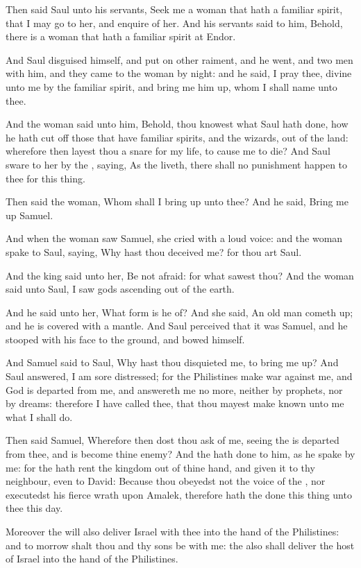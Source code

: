 \verse Then said Saul unto his servants, Seek me a woman that hath a familiar spirit, that I may go to her, and enquire of her. And his servants said to him, Behold, there is a woman that hath a familiar spirit at Endor.

\verse And Saul disguised himself, and put on other raiment, and he went, and two men with him, and they came to the woman by night: and he said, I pray thee, divine unto me by the familiar spirit, and bring me him up, whom I shall name unto thee.

\verse And the woman said unto him, Behold, thou knowest what Saul hath done, how he hath cut off those that have familiar spirits, and the wizards, out of the land: wherefore then layest thou a snare for my life, to cause me to die?  \verse And Saul sware to her by the \LORD, saying, As the \LORD liveth, there shall no punishment happen to thee for this thing.

\verse Then said the woman, Whom shall I bring up unto thee? And he said, Bring me up Samuel.

\verse And when the woman saw Samuel, she cried with a loud voice: and the woman spake to Saul, saying, Why hast thou deceived me? for thou art Saul.

\verse And the king said unto her, Be not afraid: for what sawest thou?  And the woman said unto Saul, I saw gods ascending out of the earth.

\verse And he said unto her, What form is he of? And she said, An old man cometh up; and he is covered with a mantle. And Saul perceived that it was Samuel, and he stooped with his face to the ground, and bowed himself.

\verse And Samuel said to Saul, Why hast thou disquieted me, to bring me up? And Saul answered, I am sore distressed; for the Philistines make war against me, and God is departed from me, and answereth me no more, neither by prophets, nor by dreams: therefore I have called thee, that thou mayest make known unto me what I shall do.

\verse Then said Samuel, Wherefore then dost thou ask of me, seeing the \LORD is departed from thee, and is become thine enemy?  \verse And the \LORD hath done to him, as he spake by me: for the \LORD hath rent the kingdom out of thine hand, and given it to thy neighbour, even to David: \verse Because thou obeyedst not the voice of the \LORD, nor executedst his fierce wrath upon Amalek, therefore hath the \LORD done this thing unto thee this day.

\verse Moreover the \LORD will also deliver Israel with thee into the hand of the Philistines: and to morrow shalt thou and thy sons be with me: the \LORD also shall deliver the host of Israel into the hand of the Philistines.

